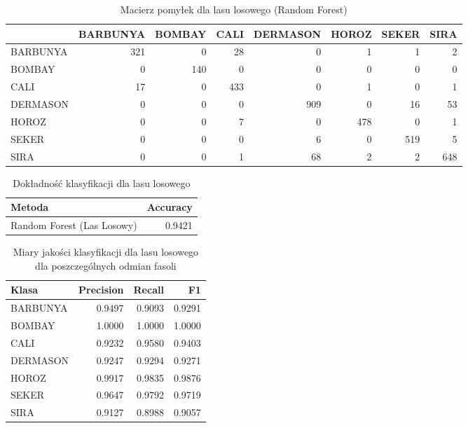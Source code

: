 \begin{table}[H]

\caption{\label{tab:conf-matrix-rf}Macierz pomyłek dla lasu losowego (Random Forest)}
\centering
\begin{tabular}[t]{lrrrrrrr}
\toprule
  & BARBUNYA & BOMBAY & CALI & DERMASON & HOROZ & SEKER & SIRA\\
\midrule
BARBUNYA & 321 & 0 & 28 & 0 & 1 & 1 & 2\\
BOMBAY & 0 & 140 & 0 & 0 & 0 & 0 & 0\\
CALI & 17 & 0 & 433 & 0 & 1 & 0 & 1\\
DERMASON & 0 & 0 & 0 & 909 & 0 & 16 & 53\\
HOROZ & 0 & 0 & 7 & 0 & 478 & 0 & 1\\
\addlinespace
SEKER & 0 & 0 & 0 & 6 & 0 & 519 & 5\\
SIRA & 0 & 0 & 1 & 68 & 2 & 2 & 648\\
\bottomrule
\end{tabular}
\end{table}

\begin{table}[H]

\caption{\label{tab:accuracy-rf}Dokładność klasyfikacji dla lasu losowego}
\centering
\begin{tabular}[t]{lr}
\toprule
Metoda & Accuracy\\
\midrule
Random Forest (Las Losowy) & 0.9421\\
\bottomrule
\end{tabular}
\end{table}

\begin{table}[H]

\caption{\label{tab:metrics-rf}Miary jakości klasyfikacji dla lasu losowego dla poszczególnych odmian fasoli}
\centering
\begin{tabular}[t]{lrrr}
\toprule
Klasa & Precision & Recall & F1\\
\midrule
BARBUNYA & 0.9497 & 0.9093 & 0.9291\\
BOMBAY & 1.0000 & 1.0000 & 1.0000\\
CALI & 0.9232 & 0.9580 & 0.9403\\
DERMASON & 0.9247 & 0.9294 & 0.9271\\
HOROZ & 0.9917 & 0.9835 & 0.9876\\
\addlinespace
SEKER & 0.9647 & 0.9792 & 0.9719\\
SIRA & 0.9127 & 0.8988 & 0.9057\\
\bottomrule
\end{tabular}
\end{table}

